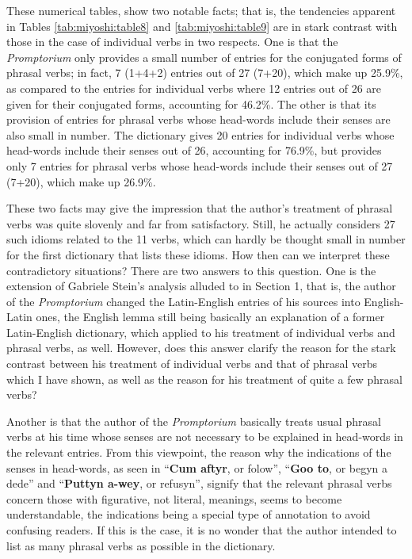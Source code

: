 \documentclass[output=paper,colorlinks,citecolor=brown,arabicfont,chinesefont]{langscibook}
\begin{document}
These numerical tables, show two notable facts; that is, the tendencies apparent in Tables  \ref{tab:miyoshi:table8} and \ref{tab:miyoshi:table9} are in stark contrast with those in the case of individual verbs in two respects. One is that the \textit{Promptorium} only provides a small number of entries for the conjugated forms of phrasal verbs; in fact, 7 (1+4+2) entries out of 27 (7+20), which make up 25.9\%, as compared to the entries for individual verbs where 12 entries out of 26 are given for their conjugated forms, accounting for 46.2\%. The other is that its provision of entries for phrasal verbs whose head-words include their senses are also small in number. The dictionary gives 20 entries for individual verbs whose head-words include their senses out of 26, accounting for 76.9\%, but provides only 7 entries for phrasal verbs whose head-words include their senses out of 27 (7+20), which make up 26.9\%.

These two facts may give the impression that the author’s treatment of phrasal verbs was quite slovenly and far from satisfactory. Still, he actually considers 27 such idioms related to the 11 verbs, which can hardly be thought small in number for the first dictionary that lists these idioms. How then can we interpret these contradictory situations? There are two answers to this question. One is the extension of Gabriele Stein’s analysis alluded to in Section 1, that is, the author of the \emph{Promptorium} changed the Latin-English entries of his sources into English-Latin ones, the English lemma still being basically an explanation of a former Latin-English dictionary, which applied to his treatment of individual verbs and phrasal verbs, as well. However, does this answer clarify the reason for the stark contrast between his treatment of individual verbs and that of phrasal verbs which I have shown, as well as the reason for his treatment of quite a few phrasal verbs?

Another is that the author of the \emph{Promptorium} basically treats usual phrasal verbs at his time whose senses are not necessary to be explained in head-words in the relevant entries. From this viewpoint, the reason why the indications of the senses in head-words, as seen in “\textbf{Cum aftyr}, or folow”, “\textbf{Goo to}, or begyn a dede” and “\textbf{Puttyn a-wey}, or refusyn”, signify that the relevant phrasal verbs concern those with figurative, not literal, meanings, seems to become understandable, the indications being a special type of annotation to avoid confusing readers. If this is the case, it is no wonder that the author intended to list as many phrasal verbs as possible in the dictionary.
\end{document}
